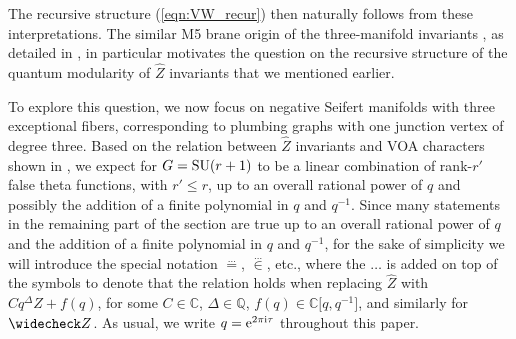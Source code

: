 \documentclass[10pt,a4paper]{amsart}
\newcommand{\CC}{\mathbb{C}}
\newcommand{\QQ}{\mathbb{Q}}
\def\bv{{\vec{\underline{b}}}}
\theoremstyle{definition}
\numberwithin{equation}{section}
\begin{document}
The recursive structure (\ref{eqn:VW_recur}) then naturally follows from these interpretations.
The similar M5 brane origin of the three-manifold invariants , as detailed in \cite{Gukov:2016gkn}, in particular motivates the question on the recursive structure of the quantum modularity of $\widehat Z$ invariants that we mentioned earlier.

To explore this question, we now focus on negative Seifert manifolds with three exceptional fibers, corresponding to plumbing graphs with one junction vertex of degree three. Based on the relation between $\widehat Z$ invariants and VOA characters shown in \cite{chengUpC,cheng20193d}, we expect \smash{$\widehat Z^G_\bv (M_3)$} for $G={\rm SU}(r+1)$ to be a linear combination of rank-$r'$ false theta functions, with $r'\leq r$, up to an overall rational power of $q$ and possibly the addition of a finite polynomial in $q$ and $q^{-1}$. Since many statements in the remaining part of the section are true up to an overall rational power of $q$ and the addition of a finite polynomial in $q$ and $q^{-1}$, for the sake of simplicity we will introduce the special notation $\stackrel{\dots}{=}$, $\stackrel{\dots}{\in}$, etc., where the $\dots$ is added on top of the symbols to denote that the relation holds when replacing $\widehat Z$ with $Cq^{\Delta}\widehat Z+f(q)$, for some $C\in \CC$, $\Delta\in \QQ$, $f(q)\in \CC\big[q,q^{-1}\big]$, and similarly for $\widecheck Z$. As usual, we write $q={\rm e}^{2\pi {\rm i} \tau}$ throughout this paper.
\end{document}
